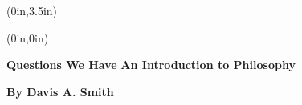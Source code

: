 \documentclass[openany,oneside,11pt]{memoir}
\begin{document}
\midsloppy

\thispagestyle{empty}
\pagecolor{philgreen}\afterpage{\nopagecolor}
\begin{textblock*}{\stockwidth}(0in,3.5in)
\end{textblock*}
\begin{textblock*}{0in}(0in,0in)
  \noindent\hfill
  \begin{minipage}[b][\stockheight][s]{.95\stockwidth}
    \begin{center}
      \vspace*{1.5cm}
      \sffamily\fontsize{66pt}{0pt}\selectfont
      \color{black}
      \textbf{Questions We Have}%
      \vskip0.5cm             
      \color{white}
      \sffamily
      \fontsize{20pt}{22pt}\selectfont
      \textbf{An Introduction to Philosophy} 
      \end{center}
\begin{raggedleft}
      \fontsize{11pt}{14pt}\selectfont
      \color{black}
     \textbf{By Davis A. Smith}\\
    \end{raggedleft}
  \end{minipage}
  \hspace*{1cm}
\end{textblock*}
\ 
\newpage

\end{document}
